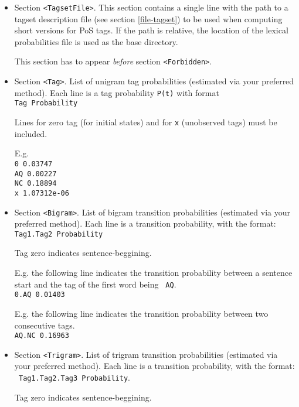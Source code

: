 \documentclass[a4paper]{book}
\begin{document}
  \begin{itemize} 
  \item Section \verb#<TagsetFile>#.  This section contains a single
    line with the path to a tagset description file (see section
    \ref{file-tagset}) to be used when computing short versions for PoS
    tags.  If the path is relative, the location of the lexical
    probabilities file is used as the base directory.

    This section has to appear {\em before} section \verb#<Forbidden>#.

    \item Section \verb#<Tag>#. List of unigram tag probabilities
      (estimated via your preferred method).  Each line is a tag
      probability {\tt P(t)} with format \\ {\tt Tag Probability}

   Lines for zero tag (for initial states) and for {\tt x} (unobserved
   tags) must be included.

  E.g.\\
    {\tt 0  0.03747}\\
    {\tt AQ 0.00227}\\
    {\tt NC 0.18894}\\
    {\tt x  1.07312e-06}

    \item Section \verb#<Bigram>#. List of bigram transition
      probabilities (estimated via your preferred method).  Each line
      is a transition probability, with the format:\\ {\tt Tag1.Tag2
        Probability}

  Tag zero indicates sentence-beggining.

    E.g. the following line indicates the transition probability
    between a sentence start and the tag of the first word being {\tt
      AQ}.\\ {\tt 0.AQ 0.01403}

    E.g. the following line indicates the transition probability
    between two consecutive tags.\\ {\tt AQ.NC 0.16963}

    \item Section \verb#<Trigram>#. List of trigram transition
      probabilities (estimated via your preferred method).  Each line
      is a transition probability, with the format:\\ {\tt
        Tag1.Tag2.Tag3 Probability}.

   Tag zero indicates sentence-beggining.


\end{itemize}
\end{document}
